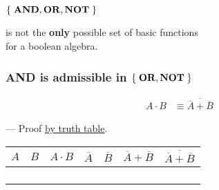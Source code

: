 \begin{frame}

\vspace{\fill}

\begin{center}

$ \mathopen{}\left\{\mathrel{}\text{\textbf{AND}}, \text{\textbf{OR}}, \text{\textbf{NOT}}\mathrel{}\right\}\mathclose{} $ \\

\bigskip

is not the \textbf{only} possible set of basic functions \\ for a boolean algebra.

\end{center}

\vspace{\fill}

\end{frame}


\begin{frame}

\frametitle{AND is admissible in $ \mathopen{}\left\{\mathrel{}\text{\textbf{OR}}, \text{\textbf{NOT}}\mathrel{}\right\}\mathclose{} $}

\begin{minipage}[t][0.5in]{\textwidth}
\begin{align*}
A \cdot B %
&\equiv \overline{\overline{A}+\overline{B}}
\end{align*}
\end{minipage}

\begin{flushright}
--- Proof \underline{by truth table}.
\end{flushright}

\vspace{\fill}

\pause

\begin{center}

\begin{tabular}{cc|>{\centering\arraybackslash}p{0.4in}|c|c|>{\centering\arraybackslash}p{0.4in}|>{\centering\arraybackslash}p{0.4in}}
$A$ & $B$ & $A \cdot B$ & $\overline{A}$ & $\overline{B}$ %
  & $\overline{A} + \overline{B}$ %
  & $\overline{\overline{A} + \overline{B}}$\\\hline
\bz{} & \bz{} & \bz{} & \bo{} & \bo{} & \bo{} & \bz{} \\
\bz{} & \bo{} & \bz{} & \bo{} & \bz{} & \bo{} & \bz{} \\
\bo{} & \bz{} & \bz{} & \bz{} & \bo{} & \bo{} & \bz{} \\
\bo{} & \bo{} & \bo{} & \bz{} & \bz{} & \bz{} & \bo{}
\end{tabular}

\end{center}

\vspace{\fill}

\end{frame}

